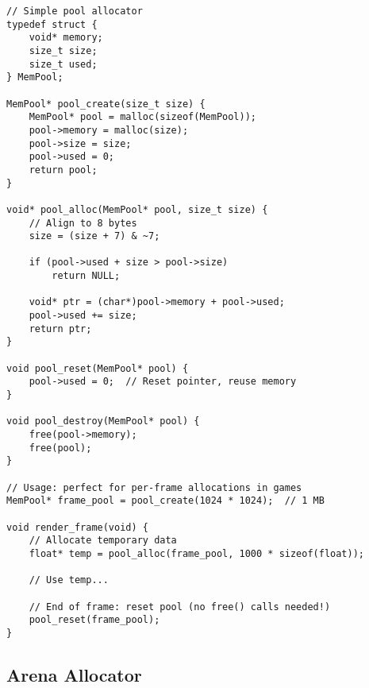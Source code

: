 \begin{lstlisting}
// Simple pool allocator
typedef struct {
    void* memory;
    size_t size;
    size_t used;
} MemPool;

MemPool* pool_create(size_t size) {
    MemPool* pool = malloc(sizeof(MemPool));
    pool->memory = malloc(size);
    pool->size = size;
    pool->used = 0;
    return pool;
}

void* pool_alloc(MemPool* pool, size_t size) {
    // Align to 8 bytes
    size = (size + 7) & ~7;

    if (pool->used + size > pool->size)
        return NULL;

    void* ptr = (char*)pool->memory + pool->used;
    pool->used += size;
    return ptr;
}

void pool_reset(MemPool* pool) {
    pool->used = 0;  // Reset pointer, reuse memory
}

void pool_destroy(MemPool* pool) {
    free(pool->memory);
    free(pool);
}

// Usage: perfect for per-frame allocations in games
MemPool* frame_pool = pool_create(1024 * 1024);  // 1 MB

void render_frame(void) {
    // Allocate temporary data
    float* temp = pool_alloc(frame_pool, 1000 * sizeof(float));

    // Use temp...

    // End of frame: reset pool (no free() calls needed!)
    pool_reset(frame_pool);
}
\end{lstlisting}

\subsection{Arena Allocator}

